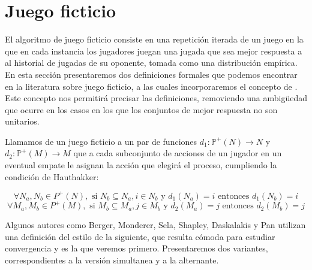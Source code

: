 
\section{Juego ficticio} \label{sec:def:fp}

El algoritmo de juego ficticio consiste en una repetición iterada de un juego en la que en cada instancia los jugadores juegan una jugada que sea mejor respuesta a al historial de jugadas de su oponente, tomada como una distribución empírica. En esta sección presentaremos dos definiciones formales que podemos encontrar en la literatura sobre juego ficticio, a las cuales incorporaremos el concepto de . Este concepto nos permitirá precisar las definiciones, removiendo una ambigüedad que ocurre en los casos en los que los conjuntos de mejor respuesta no son unitarios.

\begin{definition}
    Llamamos  de un juego ficticio a un par de funciones $d_1: \mathbb{P}^+(N) \rightarrow N$ y $d_2: \mathbb{P}^+(M) \rightarrow M$ que a cada subconjunto de acciones de un jugador en un eventual empate le asignan la acción que elegirá el proceso, cumpliendo la condición de Hauthakker:

    \[
        \forall N_a, N_b \in {P}^+(N), \text{ si } N_b \subseteq N_a, i \in N_b \text{ y } d_1(N_a) = i  \text{ entonces } d_1(N_b) = i
    \]
    \[
        \forall M_a, M_b \in {P}^+(M), \text{ si } M_b \subseteq M_a, j \in M_b \text{ y } d_2(M_a) = j  \text{ entonces } d_2(M_b) = j
    \]
\end{definition}

Algunos autores como Berger, Monderer, Sela, Shapley, Daskalakis y Pan \cite{browns:original} \cite{no:cycling} \cite{2x2:without} \cite{identical:interests} \cite{counter:karlin:strong} utilizan una definición del estilo de la siguiente, que resulta cómoda para estudiar convergencia y es la que veremos primero. Presentaremos dos variantes, correspondientes a la versión simultanea y a la alternante.


